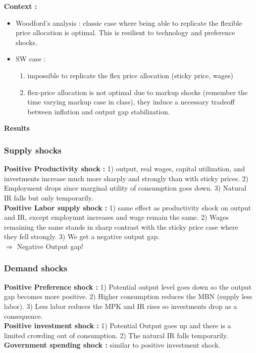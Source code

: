 \documentclass{article}
\begin{document}
\textbf{Context : }
\begin{itemize}
    \item Woodford's analysis : classic case where being able to replicate the flexible price allocation is optimal. This is resilient to technology and preference shocks. 
    \item SW case : 
    \begin{enumerate}
        \item impossible to replicate the flex price allocation (sticky price, wages)
        \item flex-price allocation is not optimal due to markup shocks (remember the time varying markup case in class), they induce a necessary tradeoff between inflation and output gap stabilization. 
    \end{enumerate}
\end{itemize}

\textbf{Results}

\subsubsection{Supply shocks }
\textbf{Positive Productivity shock :}  1) output, real wages, capital utilization, and investments increase much more sharply and strongly than with sticky prices. 2) Employment drops since marginal utility of consumption goes down. 3) Natural IR falls but only temporarily.\\ 
\textbf{Positive Labor supply shock :} 1) same effect as productivity shock on output and IR, except employmnt increases and wage remain the same. 2) Wages remaining the same stands in sharp contrast with the sticky price case where they fell strongly. 3) We get a negative output gap. \\

$\Longrightarrow$ Negative Output gap! 

\subsubsection{Demand shocks}
\textbf{Positive Preference shock : }  1) Potential output level goes down so the output gap becomes more positive. 2) Higher consumption reduces the MBN (supply less labor). 3) Less labor reduces the MPK and IR rises so investments drop as a consequence. \\
\textbf{Positive investment shock : } 1) Potential Output  goes up and there is a limited crowding out of consumption. 2) The natural IR falls temporarily. \\
\textbf{Government spending shock : } similar to positive investment shock. \\
\end{document}
